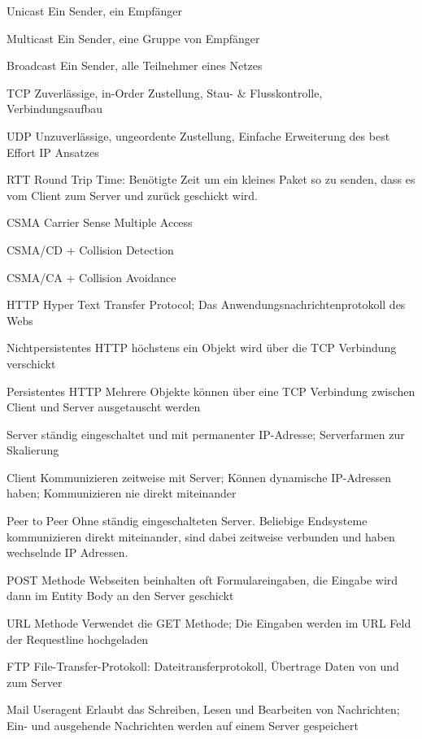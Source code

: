 \documentclass[10pt,landscape]{article}
\begin{document}
\begin{multicols}{3}
\begin{description*}
        \item[Unicast] Ein Sender, ein Empfänger
        \item[Multicast] Ein Sender, eine Gruppe von Empfänger
        \item[Broadcast] Ein Sender, alle Teilnehmer eines Netzes
        \item[TCP] Zuverlässige, in-Order Zustellung, Stau- \& Flusskontrolle, Verbindungsaufbau
        \item[UDP] Unzuverlässige, ungeordente Zustellung, Einfache Erweiterung des best Effort IP Ansatzes
        \item[RTT] Round Trip Time: Benötigte Zeit um ein kleines Paket so zu senden, dass es vom Client zum Server und zurück geschickt wird.
        \item[CSMA] Carrier Sense Multiple Access
        \item[CSMA/CD] + Collision Detection
        \item[CSMA/CA] + Collision Avoidance
        \item[HTTP] Hyper Text Transfer Protocol; Das Anwendungsnachrichtenprotokoll des Webs
        \item[Nichtpersistentes HTTP] höchstens ein Objekt wird über die TCP Verbindung verschickt
        \item[Persistentes HTTP ] Mehrere Objekte können über eine TCP Verbindung zwischen Client und Server ausgetauscht werden
        \item[Server] ständig eingeschaltet und mit permanenter IP-Adresse; Serverfarmen zur Skalierung
        \item[Client] Kommunizieren zeitweise mit Server; Können dynamische IP-Adressen haben; Kommunizieren nie direkt miteinander
        \item[Peer to Peer] Ohne ständig eingeschalteten Server. Beliebige Endsysteme kommunizieren direkt miteinander, sind dabei zeitweise verbunden und haben wechselnde IP Adressen.
        \item[POST Methode] Webseiten beinhalten oft Formulareingaben, die Eingabe wird dann im Entity Body an den Server geschickt
        \item[URL Methode] Verwendet die GET Methode; Die Eingaben werden im URL Feld der Requestline hochgeladen
        \item[FTP] File-Transfer-Protokoll: Dateitransferprotokoll, Übertrage Daten von und zum Server
        \item[Mail Useragent] Erlaubt das Schreiben, Lesen und Bearbeiten von Nachrichten; Ein- und ausgehende Nachrichten werden auf einem Server gespeichert

\end{description*}
\end{multicols}
\end{document}
